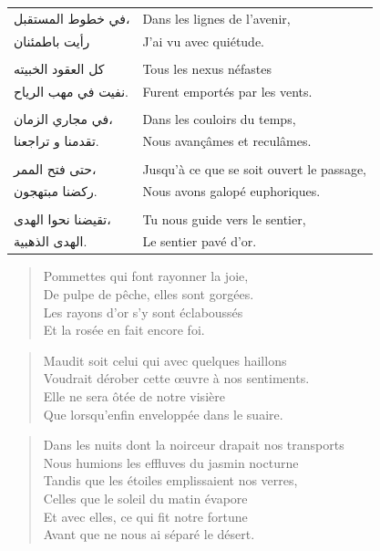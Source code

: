 \begin{longtable}{R{0.3\textwidth} L{0.65\textwidth}}
\\
\textarabic{في خطوط المستقبل،}		& Dans les lignes de l’avenir,\\
\textarabic{رأيت باطمئنان}		& J’ai vu avec quiétude.\\
\\
\textarabic{كل العقود الخبيته}		& Tous les nexus néfastes\\
\textarabic{نفيت في مهب الرياح.}		& Furent emportés par les vents.\\
\\
\textarabic{في مجاري الزمان،}		& Dans les couloirs du temps,\\
\textarabic{تقدمنا و تراجعنا.}		& Nous avançâmes et reculâmes.\\
\\
\textarabic{حتى فتح الممر،}		& Jusqu’à ce que se soit ouvert le passage,\\
\textarabic{ركضنا مبتهجون.}		& Nous avons galopé euphoriques.\\
\\
\textarabic{تقيضنا نحوا الهدى،}		& Tu nous guide vers le sentier,\\
\textarabic{الهدى الذهبية.}		& Le sentier pavé d’or.\\
\end{longtable}

\begin{verse}
Pommettes qui font rayonner la joie,\\
De pulpe de pêche, elles sont gorgées.\\
Les rayons d’or s’y sont éclaboussés\\
Et la rosée en fait encore foi.
\end{verse}




\begin{verse}
Maudit soit celui qui avec quelques haillons\\
Voudrait dérober cette œuvre à nos sentiments.\\
Elle ne sera ôtée de notre visière\\
Que lorsqu’enfin enveloppée dans le suaire.\\
\end{verse}


\begin{verse}
Dans les nuits dont la noirceur drapait nos transports\\
Nous humions les effluves du jasmin nocturne\\
Tandis que les étoiles emplissaient nos verres,\\
Celles que le soleil du matin évapore\\
Et avec elles, ce qui fit notre fortune\\
Avant que ne nous ai séparé le désert.
\end{verse}


